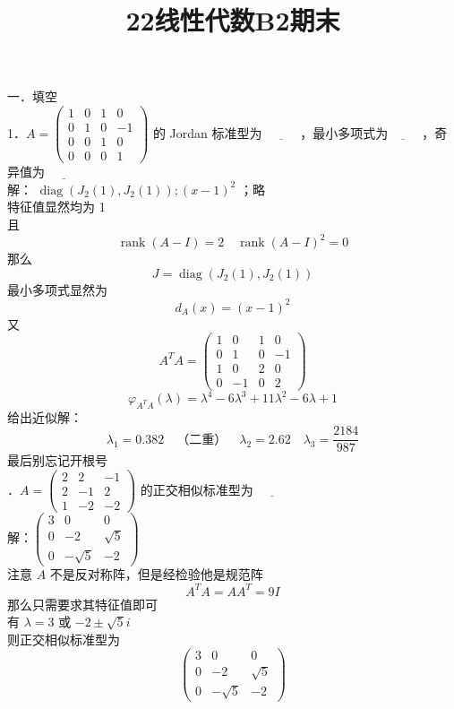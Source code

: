 \documentclass[UTF8]{ctexart}
\title{22线性代数B2期末}
\author{\calligra{NULIOUS}}
\date{}
\begin{document}
\maketitle
\noindent 一．填空\\
1．$A=\left(\begin{array}{cccc}1 & 0 & 1 & 0 \\ 0 & 1 & 0 & -1 \\ 0 & 0 & 1 & 0 \\ 0 & 0 & 0 & 1\end{array}\right)$ 的 Jordan 标准型为 $\underline{\hspace{1cm}}$ ，最小多项式为$\underline{\hspace{1cm}}$ ，奇异值为 $\underline{\hspace{1cm}}$\\
解： $\operatorname{diag}\left(J_{2}(1), J_{2}(1)\right) ;(x-1)^{2}$ ；略\\
特征值显然均为 1\\
且
 $$\operatorname{rank}(A-I)=2 \quad \operatorname{rank}(A-I)^{2}=0$$
那么 
$$J=\operatorname{diag}\left(J_{2}(1), J_{2}(1)\right)$$
最小多项式显然为 
$$d_{A}(x)=(x-1)^{2}$$
又
$$A^{T} A=\left(\begin{array}{cccc}1 & 0 & 1 & 0 \\ 0 & 1 & 0 & -1 \\ 1 & 0 & 2 & 0 \\ 0 & -1 & 0 & 2\end{array}\right)$$
$$\varphi_{A^{T} A}(\lambda)=\lambda^{4}-6 \lambda^{3}+11 \lambda^{2}-6 \lambda+1$$
给出近似解：
$$\lambda_{1}=0.382\quad \text{（二重）}\quad \lambda_{2}=2.62\quad  \lambda_{3}=\frac{2184}{987}$$
最后别忘记开根号\\



．$A=\left(\begin{array}{ccc}2 & 2 & -1 \\ 2 & -1 & 2 \\ 1 & -2 & -2\end{array}\right)$ 的正交相似标准型为 $\underline{\hspace{1cm}}$\\
解：$\left(\begin{array}{ccc}3 & 0 & 0 \\ 0 & -2 & \sqrt{5} \\ 0 & -\sqrt{5} & -2\end{array}\right)$\\
注意 $A$ 不是反对称阵，但是经检验他是规范阵 $$A^{T} A=A A^{T}=9 I$$
那么只需要求其特征值即可\\
有 $\lambda=3$ 或 $-2 \pm \sqrt{5} i$\\
则正交相似标准型为 
$$\left(\begin{array}{ccc}3 & 0 & 0 \\ 0 & -2 & \sqrt{5} \\ 0 & -\sqrt{5} & -2\end{array}\right)$$\\
\end{document}
